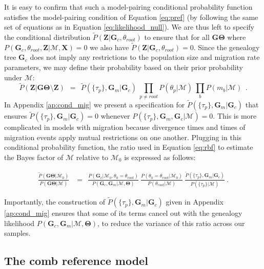\documentclass[11pt]{article}
\newcommand{\vect}[1]{\boldsymbol{\mathbf{#1}}}
\newcommand{\X}{\vect{X}}
\newcommand{\M}{\mathcal{M}}
\newcommand{\G}{\vect{G}}
\newcommand{\T}{\vect{\Theta}}
\newcommand{\GT}{\G\T}
\newcommand{\Pref}{\widetilde{P}}
\newcommand{\Z}{\vect{Z}}
\newcommand{\troot}{\theta_{root}}
\newcommand{\Gc}{\G_c}
\newcommand{\Gm}{\G_m}
\begin{document}
It is easy to confirm that such a model-pairing conditional probability function satisfies the model-pairing condition of
Equation \ref{eq:pref} (by following the same set of equations as in Equation \ref{eq:likelihood_null}).
%
We are thus left to specify the conditional distribution $\Pref(\Z|\Gc,\troot)$ to ensure that for all $\GT$ where $P(\Gc,\troot,\Z|\M,\X)=0$
we also have $\Pref(\Z|\Gc,\troot)=0$.
%
Since the genealogy tree $\Gc$ does not imply any restrictions to the population size and migration rate parameters, we may define
their probability based on their prior probability under $\M$:
%
%
\begin{equation}
 \Pref(\Z|\GT\setminus\Z) ~~=~~ 
 \Pref(\{\tau_p\},\Gm|\Gc) \ \prod_{p\neq root} P(\theta_p|\M)\ \prod_b P(m_b|\M)\  ~.\label{eq:cond_tau_mig}
\end{equation}
%
In Appendix \ref{ap:cond_mig} we present a specification for $\Pref(\{\tau_p\},\Gm|\Gc)$ that ensures $\Pref(\{\tau_p\},\Gm|\Gc)=0$
whenever $P(\{\tau_p\},\Gm,\Gc|\M)=0$.
%
This is more complicated in models with migration because divergence times and times of migration events apply mutual restrictions
on one another.
%
Plugging in this conditional probability function, the ratio used in Equation \ref{eq:rbf} to estimate the Bayes factor of $\M$ relative to $\M_0$ is expressed as follows:
%
%
\begin{small}
\begin{align}
\frac{\Pref(\GT|\M_0) }{P(\GT|\M)}
&=~~ \frac{ P(\Gc|\M_0,\theta_0=\troot) }{ P(\Gc,\Gm|\M,\T)}~ 
     \frac{ P(\theta_0=\troot|\M_0)}{P(\troot|\M)}~
     \frac{ \Pref(\{\tau_p\},\Gm|\Gc)}{P(\{\tau_p\}|\M)} ~. \label{eq:rbf_mig}
\end{align}
\end{small}

Importantly, the construction of $\Pref(\{\tau_p\},\Gm|\Gc)$ given in Appendix \ref{ap:cond_mig} ensures that some of its terms cancel out with the genealogy likelihood
$P(\Gc,\Gm|\M,\T)$, to reduce the variance of this ratio across our samples.


\subsection*{The comb reference model}
\end{document}
